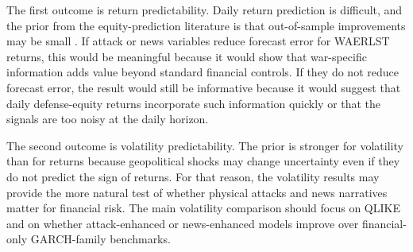 \documentclass[12pt,a4paper]{article}
\begin{document}
The first outcome is return predictability. Daily return prediction is difficult, and the prior from the equity-prediction literature is that out-of-sample improvements may be small \citep{goyal2008equity}. If attack or news variables reduce forecast error for WAERLST returns, this would be meaningful because it would show that war-specific information adds value beyond standard financial controls. If they do not reduce forecast error, the result would still be informative because it would suggest that daily defense-equity returns incorporate such information quickly or that the signals are too noisy at the daily horizon.

The second outcome is volatility predictability. The prior is stronger for volatility than for returns because geopolitical shocks may change uncertainty even if they do not predict the sign of returns. For that reason, the volatility results may provide the more natural test of whether physical attacks and news narratives matter for financial risk. The main volatility comparison should focus on QLIKE and on whether attack-enhanced or news-enhanced models improve over financial-only GARCH-family benchmarks.
\end{document}
